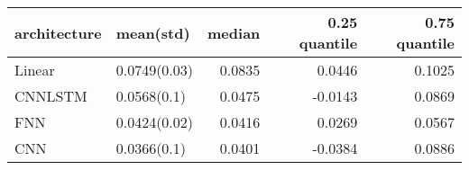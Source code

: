 \begin{tabular}{llrrr}
\toprule
architecture &    mean(std) &  median &  0.25 quantile &  0.75 quantile \\
\midrule
      Linear & 0.0749(0.03) &  0.0835 &         0.0446 &         0.1025 \\
     CNNLSTM &  0.0568(0.1) &  0.0475 &        -0.0143 &         0.0869 \\
         FNN & 0.0424(0.02) &  0.0416 &         0.0269 &         0.0567 \\
         CNN &  0.0366(0.1) &  0.0401 &        -0.0384 &         0.0886 \\
\bottomrule
\end{tabular}
